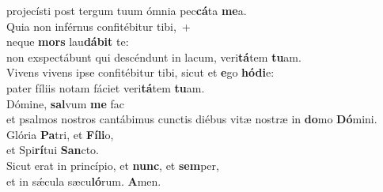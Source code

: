 \evenverse projecísti post tergum tuum ómnia pec\textbf{cá}ta \textbf{me}a.\\
\oddverse Quia non inférnus confitébitur tibi,~+\\
\oddverse  neque \textbf{mors} lau\textbf{dá}\textbf{bit} te:~\*\\
\oddverse non exspectábunt qui descéndunt in lacum, veri\textbf{tá}tem \textbf{tu}am.\\
\evenverse Vivens vivens ipse confitébitur tibi, sicut et \textbf{e}go \textbf{hó}\textbf{di}e:~\*\\
\evenverse pater fíliis notam fáciet veri\textbf{tá}tem \textbf{tu}am.\\
\oddverse Dómine, \textbf{sal}vum \textbf{me} fac~\*\\
\oddverse et psalmos nostros cantábimus cunctis diébus vitæ nostræ in \textbf{do}mo \textbf{Dó}mini.\\
\evenverse Glória \textbf{Pa}tri, et \textbf{Fí}\textbf{li}o,~\*\\
\evenverse et Spi\textbf{rí}tui \textbf{San}cto.\\
\oddverse Sicut erat in princípio, et \textbf{nunc}, et \textbf{sem}per,~\*\\
\oddverse et in sǽcula sæcu\textbf{ló}rum. \textbf{A}men.\\
